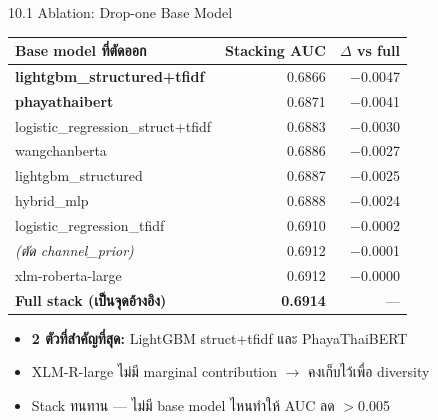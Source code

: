 \documentclass[aspectratio=169,11pt,xcolor=dvipsnames]{beamer}
\newcommand{\hl}[1]{\textcolor{kmitlOrange}{\textbf{#1}}}
\begin{document}
\begin{frame}{10.1 Ablation: Drop-one Base Model}
  \scriptsize
  \begin{tabular}{lrr}
    \toprule
    \textbf{Base model ที่ตัดออก} & \textbf{Stacking AUC} & \textbf{$\Delta$ vs full}\\
    \midrule
    \hl{lightgbm\_structured+tfidf}  & 0.6866 & $-$0.0047\\
    \hl{phayathaibert}               & 0.6871 & $-$0.0041\\
    logistic\_regression\_struct+tfidf & 0.6883 & $-$0.0030\\
    wangchanberta                     & 0.6886 & $-$0.0027\\
    lightgbm\_structured              & 0.6887 & $-$0.0025\\
    hybrid\_mlp                       & 0.6888 & $-$0.0024\\
    logistic\_regression\_tfidf       & 0.6910 & $-$0.0002\\
    \emph{(ตัด channel\_prior)}       & 0.6912 & $-$0.0001\\
    xlm-roberta-large                 & 0.6912 & $-$0.0000\\
    \midrule
    \textbf{Full stack (เป็นจุดอ้างอิง)} & \textbf{0.6914} & ---\\
    \bottomrule
  \end{tabular}
  \vspace{0.4em}
  \begin{itemize}
    \item \hl{2 ตัวที่สำคัญที่สุด:} LightGBM struct+tfidf และ PhayaThaiBERT
    \item XLM-R-large ไม่มี marginal contribution $\rightarrow$ คงเก็บไว้เพื่อ diversity
    \item Stack ทนทาน — ไม่มี base model ไหนทำให้ AUC ลด $>$0.005
  \end{itemize}
\end{frame}
\end{document}
